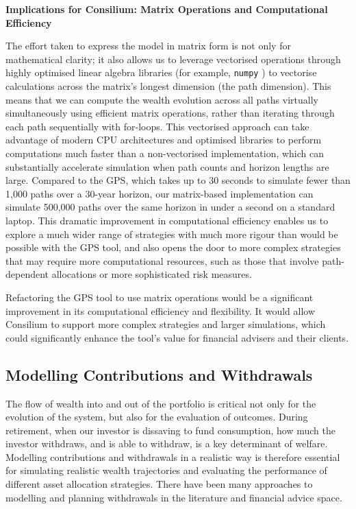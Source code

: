 \documentclass[11pt]{article}
\newcommand{\asideboxtitle}[1]{\noindent\textbf{\large #1}\par\vspace{0.5em}}
\begin{document}
\begin{asidebox}
\asideboxtitle{Implications for Consilium: Matrix Operations and Computational Efficiency}

The effort taken to express the model in matrix form is not only for mathematical clarity; it also allows us to leverage vectorised operations through highly optimised linear algebra libraries (for example, \texttt{numpy} \parencite{numpy}) to vectorise calculations across the matrix's longest dimension (the path dimension). This means that we can compute the wealth evolution across all paths virtually simultaneously using efficient matrix operations, rather than iterating through each path sequentially with for-loops. This vectorised approach can take advantage of modern CPU architectures and optimised libraries to perform computations much faster than a non-vectorised implementation, which can substantially accelerate simulation when path counts and horizon lengths are large. Compared to the GPS, which takes up to 30 seconds to simulate fewer than 1,000 paths over a 30-year horizon, our matrix-based implementation can simulate 500,000 paths over the same horizon in under a second on a standard laptop. This dramatic improvement in computational efficiency enables us to explore a much wider range of strategies with much more rigour than would be possible with the GPS tool, and also opens the door to more complex strategies that may require more computational resources, such as those that involve path-dependent allocations or more sophisticated risk measures.

Refactoring the GPS tool to use matrix operations would be a significant improvement in its computational efficiency and flexibility. It would allow Consilium to support more complex strategies and larger simulations, which could significantly enhance the tool's value for financial advisers and their clients.
\end{asidebox}

\subsection{Modelling Contributions and Withdrawals}

The flow of wealth into and out of the portfolio is critical not only for the evolution of the system, but also for the evaluation of outcomes. During retirement, when our investor is dissaving to fund consumption, how much the investor withdraws, and is able to withdraw, is a key determinant of welfare. Modelling contributions and withdrawals in a realistic way is therefore essential for simulating realistic wealth trajectories and evaluating the performance of different asset allocation strategies. There have been many approaches to modelling and planning withdrawals in the literature and financial advice space.
\end{document}
